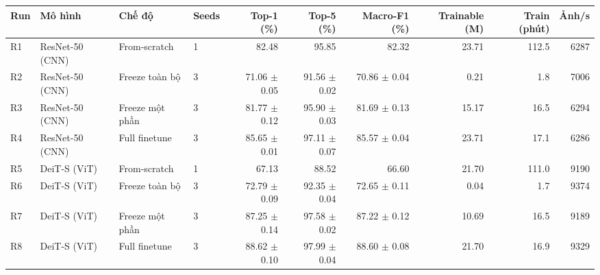 \begin{tabular}{llllrrrrrr}
\toprule
Run & Mô hình & Chế độ & Seeds & Top-1 (\%) & Top-5 (\%) & Macro-F1 (\%) & Trainable (M) & Train (phút) & Ảnh/s \\
\midrule
R1 & ResNet-50 (CNN) & From-scratch & 1 & 82.48 & 95.85 & 82.32 & 23.71 & 112.5 & 6287 \\
R2 & ResNet-50 (CNN) & Freeze toàn bộ & 3 & 71.06 $\pm$ 0.05 & 91.56 $\pm$ 0.02 & 70.86 $\pm$ 0.04 & 0.21 & 1.8 & 7006 \\
R3 & ResNet-50 (CNN) & Freeze một phần & 3 & 81.77 $\pm$ 0.12 & 95.90 $\pm$ 0.03 & 81.69 $\pm$ 0.13 & 15.17 & 16.5 & 6294 \\
R4 & ResNet-50 (CNN) & Full finetune & 3 & 85.65 $\pm$ 0.01 & 97.11 $\pm$ 0.07 & 85.57 $\pm$ 0.04 & 23.71 & 17.1 & 6286 \\
R5 & DeiT-S (ViT) & From-scratch & 1 & 67.13 & 88.52 & 66.60 & 21.70 & 111.0 & 9190 \\
R6 & DeiT-S (ViT) & Freeze toàn bộ & 3 & 72.79 $\pm$ 0.09 & 92.35 $\pm$ 0.04 & 72.65 $\pm$ 0.11 & 0.04 & 1.7 & 9374 \\
R7 & DeiT-S (ViT) & Freeze một phần & 3 & 87.25 $\pm$ 0.14 & 97.58 $\pm$ 0.02 & 87.22 $\pm$ 0.12 & 10.69 & 16.5 & 9189 \\
R8 & DeiT-S (ViT) & Full finetune & 3 & 88.62 $\pm$ 0.10 & 97.99 $\pm$ 0.04 & 88.60 $\pm$ 0.08 & 21.70 & 16.9 & 9329 \\
\bottomrule
\end{tabular}